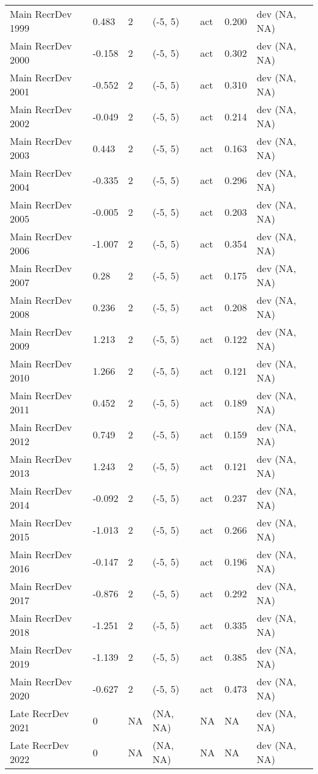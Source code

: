 \documentclass[11pt,
  english,
  letterpaper,
]{article}
\begin{document}
\begin{landscape}
\begin{longtable}[t]{>{\raggedright\arraybackslash}p{7.5cm}lllll>{\raggedright\arraybackslash}p{3.5cm}}
Main RecrDev 1999 & 0.483 & 2 & (-5, 5) & act & 0.200 & dev (NA, NA)\\
Main RecrDev 2000 & -0.158 & 2 & (-5, 5) & act & 0.302 & dev (NA, NA)\\
Main RecrDev 2001 & -0.552 & 2 & (-5, 5) & act & 0.310 & dev (NA, NA)\\
Main RecrDev 2002 & -0.049 & 2 & (-5, 5) & act & 0.214 & dev (NA, NA)\\
Main RecrDev 2003 & 0.443 & 2 & (-5, 5) & act & 0.163 & dev (NA, NA)\\
Main RecrDev 2004 & -0.335 & 2 & (-5, 5) & act & 0.296 & dev (NA, NA)\\
Main RecrDev 2005 & -0.005 & 2 & (-5, 5) & act & 0.203 & dev (NA, NA)\\
Main RecrDev 2006 & -1.007 & 2 & (-5, 5) & act & 0.354 & dev (NA, NA)\\
Main RecrDev 2007 & 0.28 & 2 & (-5, 5) & act & 0.175 & dev (NA, NA)\\
Main RecrDev 2008 & 0.236 & 2 & (-5, 5) & act & 0.208 & dev (NA, NA)\\
Main RecrDev 2009 & 1.213 & 2 & (-5, 5) & act & 0.122 & dev (NA, NA)\\
Main RecrDev 2010 & 1.266 & 2 & (-5, 5) & act & 0.121 & dev (NA, NA)\\
Main RecrDev 2011 & 0.452 & 2 & (-5, 5) & act & 0.189 & dev (NA, NA)\\
Main RecrDev 2012 & 0.749 & 2 & (-5, 5) & act & 0.159 & dev (NA, NA)\\
Main RecrDev 2013 & 1.243 & 2 & (-5, 5) & act & 0.121 & dev (NA, NA)\\
Main RecrDev 2014 & -0.092 & 2 & (-5, 5) & act & 0.237 & dev (NA, NA)\\
Main RecrDev 2015 & -1.013 & 2 & (-5, 5) & act & 0.266 & dev (NA, NA)\\
Main RecrDev 2016 & -0.147 & 2 & (-5, 5) & act & 0.196 & dev (NA, NA)\\
Main RecrDev 2017 & -0.876 & 2 & (-5, 5) & act & 0.292 & dev (NA, NA)\\
Main RecrDev 2018 & -1.251 & 2 & (-5, 5) & act & 0.335 & dev (NA, NA)\\
Main RecrDev 2019 & -1.139 & 2 & (-5, 5) & act & 0.385 & dev (NA, NA)\\
Main RecrDev 2020 & -0.627 & 2 & (-5, 5) & act & 0.473 & dev (NA, NA)\\
Late RecrDev 2021 & 0 & NA & (NA, NA) & NA & NA & dev (NA, NA)\\
Late RecrDev 2022 & 0 & NA & (NA, NA) & NA & NA & dev (NA, NA)\\

\end{longtable}
\end{landscape}
\end{document}
